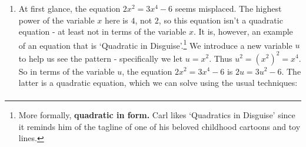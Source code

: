 \documentclass{ximera}
\begin{document}
{{{{{\begin{example}
\begin{enumerate}
\[\begin{array}{rclr}
& = &  \dfrac{-100\sqrt{3} \pm \sqrt{30000 +3920}}{-98}  & \\ [10pt]

& = &  \dfrac{-100\sqrt{3} \pm \sqrt{33920}}{-98}  & \\ [10pt]

& = &  \dfrac{-100\sqrt{3} \pm 8\sqrt{530}}{-98}  & \\ [10pt]

& = &  \dfrac{2(-50\sqrt{3} \pm 4\sqrt{530})}{2(-49)}  & \\ [10pt]

& = &  \dfrac{-50\sqrt{3} \pm 4\sqrt{530}}{-49}  & \text{Reduce} \\ [10pt]

& = &  \dfrac{-(-50\sqrt{3} \pm 4\sqrt{530})}{49}  & \text{Properties of Negatives} \\ [10pt]

& = & \dfrac{50\sqrt{3} \mp 4\sqrt{530}}{49} & \text{Distribute} \\ 

\end{array}\]

You'll note that when we `distributed' the negative in the last step, we changed the `$\pm$' to a `$\mp$.'  While this is technically correct, at the end of the day both symbols mean `plus or minus',\footnote{There are instances where we need both symbols, however.  For example, the Sum and Difference of Cubes Formulas (page \pageref{CommonFactoringFormulas}) can be written as a single formula:  $a^3 \pm b^3 = (a \pm b) (a^2 \mp ab + b^2)$.  In this case, all of the `top' symbols are read to give the sum formula;  the `bottom' symbols give the difference formula.} so we can write our answers as $t =  \frac{50\sqrt{3} \pm 4\sqrt{530}}{49}$. Checking these answers are a true test of arithmetic mettle.

\item At first glance, the equation $2x^2 = 3x^4 - 6$ seems misplaced.  The highest power of the variable $x$ here is $4$, not $2$, so this equation isn't a quadratic equation - at least not in terms of the variable $x$.  It is, however, an example of an equation that is `Quadratic in Disguise'.\footnote{More formally, \textbf{quadratic in form.} Carl likes `Quadratics in Disguise' since it reminds him of the tagline of one of his beloved childhood cartoons and toy lines.} We introduce a new variable $u$ to help us see the pattern - specifically we let $u = x^2$.  Thus $u^2 = (x^2)^2 = x^4$.  So in terms of the variable $u$, the equation $2x^2 = 3x^4 - 6$ is $2u = 3u^2 - 6$.  The latter is a quadratic equation, which we can solve using the usual techniques:\[ \begin{array}{rclr}


\end{array}\]
\end{enumerate}
\end{example}}}}}}
\end{document}

